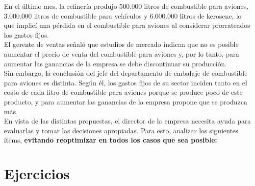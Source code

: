 \documentclass[10pt,a4paper]{article}
\begin{document}
En el último mes, la refinería produjo 500.000 litros de combustible para aviones, 3.000.000 litros de combustible
para vehículos y 6.000.000 litros de kerosene, lo que implicí una pérdida en el combustible para aviones al considerar
prorrateados los gastos fijos. \\

El gerente de ventas señaló que estudios de mercado indican que no es posible aumentar el precio de venta del combustible para aviones y, por lo tanto,
para aumentar las ganancias de la empresa se debe discontinuar su producción. \\

Sin embargo, la conclusión del jefe del departamento de embalaje de combustible para aviones es distinta. Según él,
los gastos fijos de su sector inciden tanto en el costo de cada litro de combustible para aviones porque se produce
poco de este producto, y para aumentar las ganancias de la empresa propone que se produzca más. \\

En vista de las distintas propuestas, el director de la empresa necesita ayuda para evaluarlas y tomar las decisiones
apropiadas. Para esto, analizar los siguientes ítems, \textbf{evitando reoptimizar en todos los casos que sea posible:}

\clearpage

\section{Ejercicios} 
\end{document}
